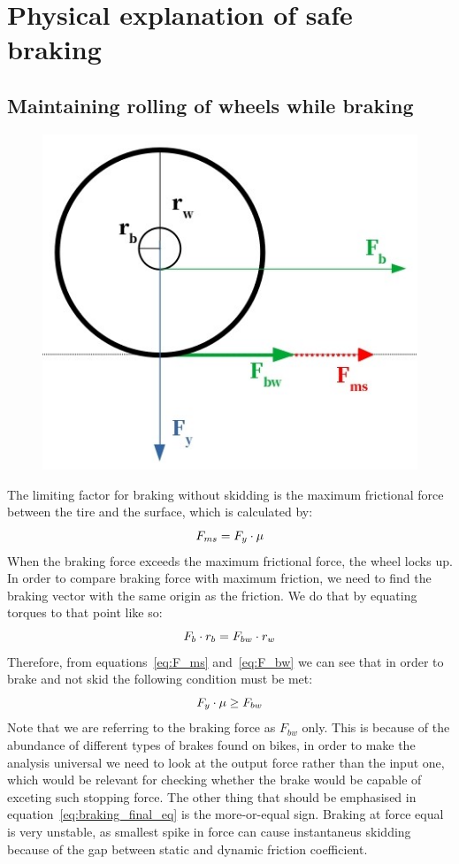 \documentclass[12pt, a4]{article}
\begin{document}
\section{Physical explanation of safe braking}
\subsection{Maintaining rolling of wheels while braking}
\begin{figure}[H]
\centering
\caption{}
\includegraphics[width=0.5\linewidth]{wheel_braking_forces}%
\label{fig:wheel_diagram_1}
\end{figure}
The limiting factor for braking without skidding is the maximum frictional force between the tire and the 
surface, which is calculated by:
\begin{equation}
\centering%
\label{eq:F_ms}
F_{ms} = F_y \cdot \mu
\end{equation}
When the braking force exceeds the maximum frictional force, the wheel locks up. In order to compare braking 
force with maximum friction, we need to find the braking vector with the same origin as the friction. We do 
that by equating torques to that point like so:
\begin{equation}
\centering%
\label{eq:F_bw}
F_b \cdot r_b = F_{bw} \cdot r_w
\end{equation}
Therefore, from equations~\ref{eq:F_ms} and~\ref{eq:F_bw} we can see that in order to brake and not skid the 
following condition must be met:
\begin{equation}
\centering%
\label{eq:braking_final_eq}
F_y \cdot \mu \geq F_{bw}
\end{equation}
Note that we are referring to the braking force as $F_{bw}$ only. This is because of the abundance of different
types of brakes found on bikes, in order to make the analysis universal we need to look at the output force rather
than the input one, which would be relevant for checking whether the brake would be capable of exceting
such stopping force. The other thing that should be emphasised in equation~\ref{eq:braking_final_eq} is the 
more-or-equal sign. Braking at force equal is very unstable, as smallest spike in force can cause instantaneus 
skidding because of the gap between static and dynamic friction coefficient.
\end{document}
